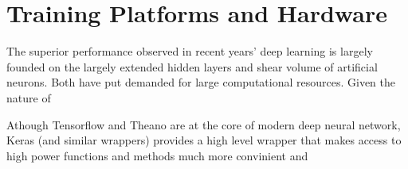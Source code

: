 \section{Training Platforms and Hardware}
The superior performance observed in recent years' deep learning is largely founded on the largely extended hidden layers and shear volume of artificial neurons. Both have put demanded for large computational resources. Given the nature of

Athough Tensorflow and Theano are at the core of modern deep neural network, Keras (and similar wrappers) provides a high level wrapper that makes access to high power functions and methods much more convinient and 